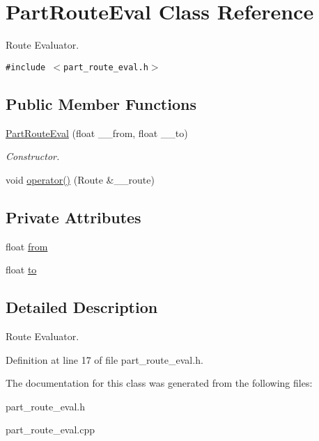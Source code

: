 \hypertarget{classPartRouteEval}{
\section{Part\-Route\-Eval Class Reference}
\label{classPartRouteEval}
}
Route Evaluator.  


{\tt \#include $<$part\_\-route\_\-eval.h$>$}

\subsection*{Public Member Functions}
\begin{CompactItemize}
\item 
\hypertarget{classPartRouteEval_a331566b29bc3227f377004232f05491}{
\hyperlink{classPartRouteEval_a331566b29bc3227f377004232f05491}{Part\-Route\-Eval} (float \_\-\_\-from, float \_\-\_\-to)}
\label{classPartRouteEval_a331566b29bc3227f377004232f05491}

\begin{CompactList}\small\item\em Constructor. \item\end{CompactList}\item 
\hypertarget{classPartRouteEval_965fab875fb601f17934a6ece761beae}{
void \hyperlink{classPartRouteEval_965fab875fb601f17934a6ece761beae}{operator()} (Route \&\_\-\_\-route)}
\label{classPartRouteEval_965fab875fb601f17934a6ece761beae}

\end{CompactItemize}
\subsection*{Private Attributes}
\begin{CompactItemize}
\item 
\hypertarget{classPartRouteEval_5bde722e66378b2570ae6c4b4f8df58e}{
float \hyperlink{classPartRouteEval_5bde722e66378b2570ae6c4b4f8df58e}{from}}
\label{classPartRouteEval_5bde722e66378b2570ae6c4b4f8df58e}

\item 
\hypertarget{classPartRouteEval_de53cc919faa498663f327b72c357da3}{
float \hyperlink{classPartRouteEval_de53cc919faa498663f327b72c357da3}{to}}
\label{classPartRouteEval_de53cc919faa498663f327b72c357da3}

\end{CompactItemize}


\subsection{Detailed Description}
Route Evaluator. 



Definition at line 17 of file part\_\-route\_\-eval.h.

The documentation for this class was generated from the following files:\begin{CompactItemize}
\item 
part\_\-route\_\-eval.h\item 
part\_\-route\_\-eval.cpp\end{CompactItemize}
